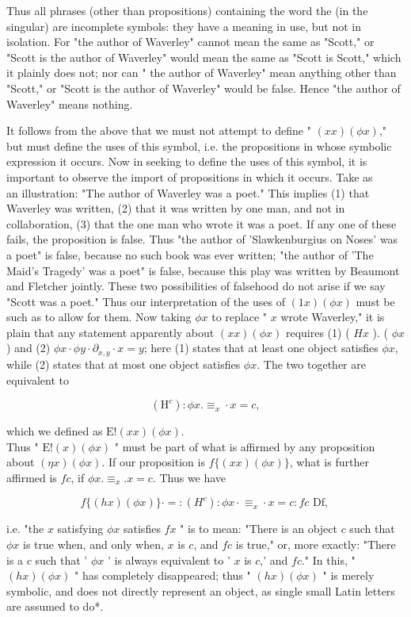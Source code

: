 \documentclass[10pt]{article}
\begin{document}
Thus all phrases (other than propositions) containing the word the (in the singular) are incomplete symbols: they have a meaning in use, but not in isolation. For "the author of Waverley" cannot mean the same as "Scott," or "Scott is the author of Waverley" would mean the same as "Scott is Scott," which it plainly does not; nor can " the author of Waverley" mean anything other than "Scott," or "Scott is the author of Waverley" would be false. Hence "the author of Waverley" means nothing.

It follows from the above that we must not attempt to define " $(x x)(\phi x)$," but must define the uses of this symbol, i.e. the propositions in whose symbolic expression it occurs. Now in seeking to define the uses of this symbol, it is important to observe the import of propositions in which it occurs. Take as\\
an illustration: "The author of Waverley was a poet." This implies (1) that Waverley was written, (2) that it was written by one man, and not in collaboration, (3) that the one man who wrote it was a poet. If any one of these fails, the proposition is false. Thus "the author of 'Slawkenburgius on Noses' was a poet" is false, because no such book was ever written; "the author of 'The Maid's Tragedy' was a poet" is false, because this play was written by Beaumont and Fletcher jointly. These two possibilities of falsehood do not arise if we say "Scott was a poet." Thus our interpretation of the uses of $(1 x)(\phi x)$ must be such as to allow for them. Now taking $\phi x$ to replace " $x$ wrote Waverley," it is plain that any statement apparently about $(x x)(\phi x)$ requires (1) ( $H x$ ). ( $\phi x$ ) and (2) $\phi x \cdot \phi y \cdot \partial_{x, y} \cdot x=y$; here (1) states that at least one object satisfies $\phi x$, while (2) states that at most one object satisfies $\phi x$. The two together are equivalent to

$$
\left(\mathrm{H}^{c}\right): \phi x . \equiv_{x} \cdot x=c,
$$

which we defined as $\mathrm{E}!(x x)(\phi x)$.\\
Thus " $\mathrm{E}!(x)(\phi x)$ " must be part of what is affirmed by any proposition about $(\eta x)(\phi x)$. If our proposition is $f\{(x x)(\phi x)\}$, what is further affirmed is $f c$, if $\phi x . \equiv_{x} . x=c$. Thus we have

$$
f\{(h x)(\phi x)\} \cdot=:\left(H^{c}\right): \phi x \cdot \equiv_{x} \cdot x=c: f c \text { Df, }
$$

i.e. "the $x$ satisfying $\phi x$ satisfies $f x$ " is to mean: "There is an object $c$ such that $\phi x$ is true when, and only when, $x$ is $c$, and $f c$ is true," or, more exactly: "There is a $c$ such that ' $\phi x$ ' is always equivalent to ' $x$ is $c$,' and $f c$." In this, " $(h x)(\phi x)$ " has completely disappeared; thus " $(h x)(\phi x)$ " is merely symbolic, and does not directly represent an object, as single small Latin letters are assumed to do*.
\end{document}
